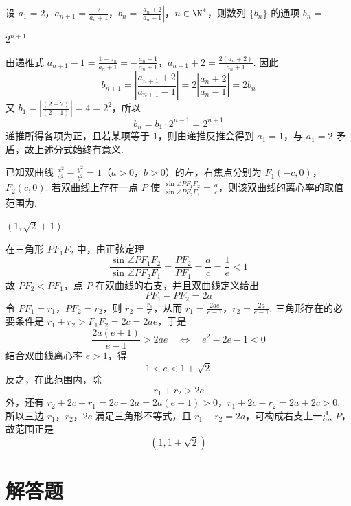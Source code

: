 \begin{problem}
设 \(a_1 = 2\)，\(a_{n+1} = \frac{2}{a_n + 1}\)，\(b_n = \left|\frac{a_n + 2}{a_n - 1}\right|\)，\(n \in \N^{*}\)，则数列 \(\{b_n\}\) 的通项 \(b_n =\)\fillinblank{}.

\begin{answer}
\(2^{n+1}\)
\end{answer}

\begin{solution}
由递推式
\(a_{n+1}-1=\frac{1-a_n}{a_n+1}=-\frac{a_n-1}{a_n+1}\)，\(a_{n+1}+2=\frac{2(a_n+2)}{a_n+1}\).
因此
\[
b_{n+1}=\left|\frac{a_{n+1}+2}{a_{n+1}-1}\right|
=2\left|\frac{a_n+2}{a_n-1}\right|=2b_n
\]
又 \(b_1=|\frac{(2+2)}{(2-1)}|=4=2^2\)，所以
\[
b_n=b_1\cdot2^{n-1}=2^{n+1}
\]
递推所得各项为正，且若某项等于 1，则由递推反推会得到 \(a_1=1\)，与 \(a_1=2\) 矛盾，故上述分式始终有意义.
\end{solution}
\end{problem}

\begin{problem}
已知双曲线 \(\frac{x^{2}}{a^{2}} - \frac{y^{2}}{b^{2}} = 1\)（\(a > 0\)，\(b > 0\)）的左，右焦点分别为 \(F_{1}(-c, 0)\)，\(F_{2}(c, 0)\). 若双曲线上存在一点 \(P\) 使 \(\frac{\sin \angle PF_{1}F_{2}}{\sin \angle PF_{2}F_{1}} = \frac{a}{c}\)，则该双曲线的离心率的取值范围为\fillinblank{}.

\begin{answer}
\((1,\sqrt{2}+1)\)
\end{answer}

\begin{solution}
在三角形 \(PF_1F_2\) 中，由正弦定理
\[
\frac{\sin\angle PF_1F_2}{\sin\angle PF_2F_1}
=\frac{PF_2}{PF_1}=\frac{a}{c}=\frac1e<1
\]
故 \(PF_2<PF_1\)，点 \(P\) 在双曲线的右支，并且双曲线定义给出
\[
PF_1-PF_2=2a
\]
令 \(PF_1=r_1\)，\(PF_2=r_2\)，则 \(r_2=\frac{r_1}{e}\)，从而
\(r_1=\frac{2ae}{e-1}\)，\(r_2=\frac{2a}{e-1}\).
三角形存在的必要条件是 \(r_1+r_2>F_1F_2=2c=2ae\)，于是
\[
\frac{2a(e+1)}{e-1}>2ae
\quad\Longleftrightarrow\quad
e^2-2e-1<0
\]
结合双曲线离心率 \(e>1\)，得
\[
1<e<1+\sqrt2
\]
反之，在此范围内，除
\[
r_1+r_2>2c
\]
外，还有
\(r_2+2c-r_1=2c-2a=2a(e-1)>0\)，\(r_1+2c-r_2=2a+2c>0\).
所以三边 \(r_1\)，\(r_2\)，\(2c\) 满足三角形不等式，且 \(r_1-r_2=2a\)，可构成右支上一点 \(P\)，故范围正是
\[
(1,1+\sqrt2)
\]
\end{solution}
\end{problem}

\section{解答题}


